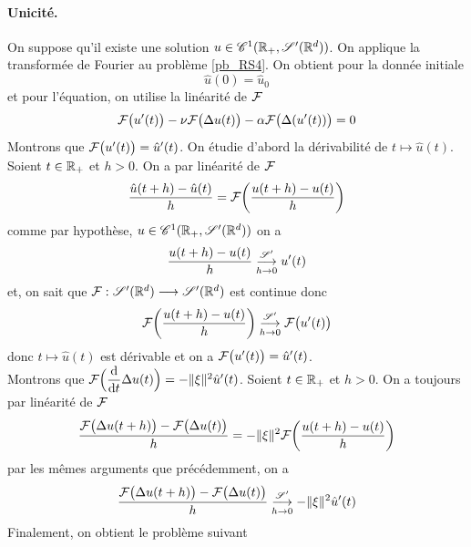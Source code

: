 \paragraph{Unicité.} On suppose qu'il existe une solution $u \in \mathscr{C}^1(\mathbb{R}_+,\mathscr{S}'(\mathbb{R}^d))$. On applique la transformée de Fourier au problème \eqref{pb_RS4}. On obtient pour la donnée initiale
\begin{equation*}
    \hat{u}(0) = \hat{u}_0
\end{equation*}
et pour l'équation, on utilise la linéarité de $\mathcal{F}$
\begin{equation*}
    \mathcal{F}\big(u'(t)\big)-\nu\mathcal{F}\big(\Delta u(t)\big)-\alpha\mathcal{F}\big(\Delta(u'(t))\big) = 0
\end{equation*}
Montrons que $\mathcal{F}\big(u'(t)\big)=\hat{u}'(t)$. On étudie d'abord la dérivabilité de $t \mapsto \hat{u}(t)$. Soient $t \in \mathbb{R}_+$ et $h>0$. On a par linéarité de $\mathcal{F}$
\begin{equation*}
    \frac{\hat{u}(t+h)-\hat{u}(t)}{h} = \mathcal{F}\bigg(\frac{u(t+h)-u(t)}{h}\bigg)
\end{equation*}
comme par hypothèse, $u \in \mathscr{C}^1(\mathbb{R}_+,\mathscr{S}'(\mathbb{R}^d))$ on a
\begin{equation*}
    \frac{u(t+h)-u(t)}{h} \overset{\mathscr{S}'}{\underset{h \to 0}{\longrightarrow}} u'(t)
\end{equation*}
et, on sait que $\mathcal{F} : \mathscr{S}'(\mathbb{R}^d) \longrightarrow \mathscr{S}'(\mathbb{R}^d)$ est continue donc 
\begin{equation*}
    \mathcal{F}\bigg(\frac{u(t+h)-u(t)}{h}\bigg) \overset{\mathscr{S}'}{\underset{h \to 0}{\longrightarrow}} \mathcal{F}\big(u'(t)\big)
\end{equation*}
donc $t \mapsto \hat{u}(t)$ est dérivable et on a $\mathcal{F}\big(u'(t)\big)=\hat{u}'(t)$. 
\\
Montrons que $\mathcal{F}\Big(\dfrac{\mathrm{d}}{\mathrm{d}t}\Delta u(t)\Big) = -\|\xi\|^2\hat{u}'(t)$. Soient $t \in \mathbb{R}_+$ et $h>0$. On a toujours par linéarité de $\mathcal{F}$
\begin{equation*}
    \frac{\mathcal{F}\big(\Delta u(t+h)\big)-\mathcal{F}\big(\Delta u(t)\big)}{h} = -\|\xi\|^2\mathcal{F}\bigg(\frac{u(t+h)-u(t)}{h}\bigg)
\end{equation*}
par les mêmes arguments que précédemment, on a 
\begin{equation*}
    \frac{\mathcal{F}\big(\Delta u(t+h)\big)-\mathcal{F}\big(\Delta u(t)\big)}{h} \overset{\mathscr{S}'}{\underset{h \to 0}{\longrightarrow}} -\|\xi\|^2\hat{u}'(t)
\end{equation*}
Finalement, on obtient le problème suivant
